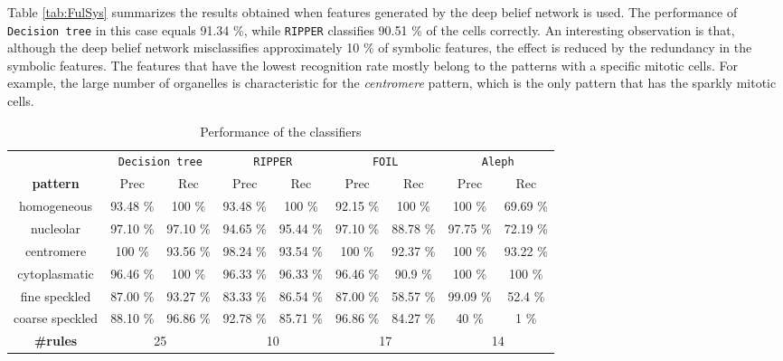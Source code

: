 Table \ref{tab:FulSys} summarizes the results obtained when features generated by the deep belief network is used. The performance of \texttt{Decision tree} in this case equals 91.34 \%, while \texttt{RIPPER} classifies 90.51 \% of the cells correctly. An interesting observation is that, although the deep belief network misclassifies approximately 10 \% of symbolic features, the effect is reduced by the redundancy in the symbolic features. The features that have the lowest recognition rate mostly belong to the patterns with a specific mitotic cells. For example, the large number of organelles is characteristic for the \textit{centromere} pattern, which is the only pattern that has the sparkly mitotic cells. 


\begin{table}
	\scriptsize
	\caption{Performance of the classifiers}
	\label{tab:Perf}
	\begin{tabular}{|c|c|c||c|c||c|c||c|c|}
		\hline
		& \multicolumn{2}{c}{\texttt{Decision tree}} & \multicolumn{2}{c}{\texttt{RIPPER}} & \multicolumn{2}{c}{\texttt{FOIL}} & \multicolumn{2}{c}{\texttt{Aleph}} \\
		\textbf{pattern} & Prec & Rec & Prec & Rec & Prec & Rec & Prec & Rec \\
		\hline \hline
		homogeneous & 93.48 \% & 100 \% & 93.48 \% & 100 \% & 92.15 \% & 100 \% & 100 \% & 69.69 \% \\
		nucleolar & 97.10 \% & 97.10 \% & 94.65 \% & 95.44 \% & 97.10 \% & 88.78 \% & 97.75 \% & 72.19 \%\\
		centromere & 100 \% & 93.56 \% & 98.24 \% & 93.54 \% & 100 \% & 92.37 \% & 100 \% & 93.22 \%\\
		cytoplasmatic & 96.46 \% & 100 \% & 96.33 \% & 96.33 \% & 96.46 \% & 90.9 \% & 100 \% & 100 \% \\
		fine speckled & 87.00 \% & 93.27 \% & 83.33 \% & 86.54 \% & 87.00 \% & 58.57 \% & 99.09 \% & 52.4 \%\\
		coarse speckled & 88.10 \% & 96.86 \% & 92.78 \% & 85.71 \% & 96.86 \% & 84.27 \% & 40 \% & 1 \%\\
		\hline \hline
		\textbf{\#rules} & \multicolumn{2}{c}{25} & \multicolumn{2}{c}{10} & \multicolumn{2}{c}{17} & \multicolumn{2}{c}{14} \\
		\hline
	\end{tabular}
\end{table}

